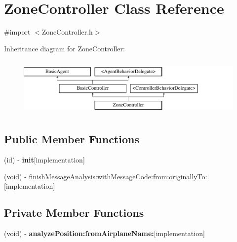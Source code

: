 \hypertarget{interface_zone_controller}{
\section{\-Zone\-Controller \-Class \-Reference}
\label{interface_zone_controller}
}


{\ttfamily \#import $<$\-Zone\-Controller.\-h$>$}

\-Inheritance diagram for \-Zone\-Controller\-:\begin{figure}[H]
\begin{center}
\leavevmode
\includegraphics[height=2.931937cm]{interface_zone_controller}
\end{center}
\end{figure}
\subsection*{\-Public \-Member \-Functions}
\begin{DoxyCompactItemize}
\item 
\hypertarget{interface_zone_controller_a7f77c80ebe53f4dcde9dfbdc703a2d38}{
(id) -\/ {\bfseries init}{\ttfamily  \mbox{[}implementation\mbox{]}}}
\label{interface_zone_controller_a7f77c80ebe53f4dcde9dfbdc703a2d38}

\item 
(void) -\/ \hyperlink{interface_zone_controller_aaee71e51737c671990bd2c5594344fba}{finish\-Message\-Analysis\-:with\-Message\-Code\-:from\-:originally\-To\-:}{\ttfamily  \mbox{[}implementation\mbox{]}}
\end{DoxyCompactItemize}
\subsection*{\-Private \-Member \-Functions}
\begin{DoxyCompactItemize}
\item 
\hypertarget{interface_zone_controller_a92ba61e4c98a97aa3d2d7f9114a269f1}{
(void) -\/ {\bfseries analyze\-Position\-:from\-Airplane\-Name\-:}{\ttfamily  \mbox{[}implementation\mbox{]}}}
\label{interface_zone_controller_a92ba61e4c98a97aa3d2d7f9114a269f1}

\end{DoxyCompactItemize}


